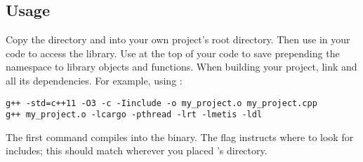 \subsection{Usage}

Copy the  directory and  into your own project's root directory. Then
use  in your code to access the library. Use
 at the top of your code to save prepending the
 namespace to library objects and functions. When building your
project, link  and all its dependencies. For example, using :
\begin{verbatim}
g++ -std=c++11 -O3 -c -Iinclude -o my_project.o my_project.cpp
g++ my_project.o -lcargo -pthread -lrt -lmetis -ldl
\end{verbatim}
The first  command compiles  into the
 binary. The  flag instructs  where to
look for includes; this should match wherever you placed 's 
directory.

